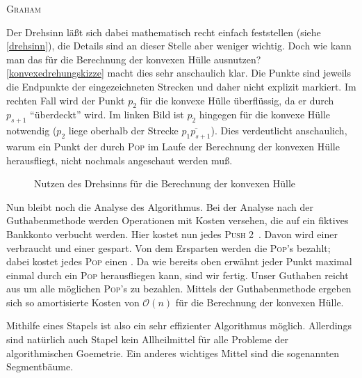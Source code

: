 \documentclass[ngerman,draft,parskip=half*,twoside]{scrreprt}
\theoremstyle{break}
\theoremstyle{nonumberbreak}
\newcommand*{\OO}{\mathcal{O}}      %
\begin{document}
\begin{algorithm}
\caption{\textsc{Graham}}
\end{algorithm}

Der Drehsinn läßt sich dabei mathematisch recht einfach feststellen (siehe \autoref{drehsinn}), die Details sind an dieser Stelle
aber weniger wichtig.
Doch wie kann man das für die Berechnung
der konvexen Hülle ausnutzen?  \autoref{konvexedrehungskizze} macht dies sehr anschaulich klar. Die Punkte sind jeweils die
Endpunkte der eingezeichneten Strecken und daher nicht explizit markiert. Im rechten Fall wird der Punkt $p_2$ für die konvexe Hülle
überflüssig, da er durch $p_{s+1}$ "`überdeckt"' wird. Im linken Bild ist $p_2$ hingegen für die konvexe Hülle notwendig ($p_2$
liege oberhalb der Strecke $\overline{p_1p_{s+1}}$). Dies verdeutlicht anschaulich, warum ein Punkt der durch
\textsc{Pop} im Laufe der Berechnung der konvexen Hülle herausfliegt, nicht nochmals angeschaut werden muß.

\begin{figure}[H]
\centering


\caption{Nutzen des Drehsinns für die Berechnung der konvexen Hülle}
\label{konvexedrehungskizze}
\end{figure}

Nun bleibt noch die Analyse des Algorithmus. Bei der Analyse nach der Guthabenmethode werden Operationen mit Kosten versehen, die auf ein fiktives Bankkonto
verbucht werden. Hier kostet nun jedes \textsc{Push} 2~\officialeuro{}. Davon wird einer verbraucht und einer
gespart. Von dem Ersparten werden die \textsc{Pop}'s bezahlt; dabei kostet jedes \textsc{Pop} einen . Da wie bereits oben erwähnt jeder
Punkt maximal einmal durch ein \textsc{Pop} herausfliegen kann, sind wir fertig. Unser Guthaben reicht aus um alle möglichen
\textsc{Pop}'s zu bezahlen. Mittels der Guthabenmethode ergeben sich so amortisierte Kosten von $\OO(n)$ für die Berechnung der konvexen
Hülle.

Mithilfe eines Stapels ist also ein sehr effizienter Algorithmus möglich. Allerdings sind natürlich auch Stapel kein Allheilmittel
für alle Probleme der algorithmischen Goemetrie. Ein anderes wichtiges Mittel sind die sogenannten Segmentbäume.
\end{document}
